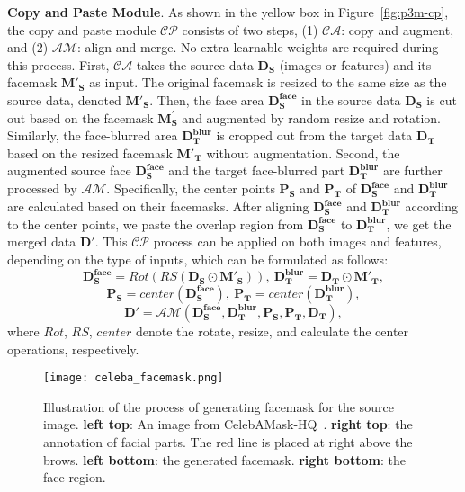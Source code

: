 \documentclass[twocolumn]{svjour3}
\begin{document}
\textbf{Copy and Paste Module}. As shown in the yellow box in Figure~\ref{fig:p3m-cp}, the copy and paste module $\mathcal{CP}$ consists of two steps, (1) $\mathcal{CA}$: copy and augment, and (2) $\mathcal{AM}$: align and merge. No extra learnable weights are required during this process. First, $\mathcal{CA}$ takes the source data $\mathbf{D_S}$ (images or features) and its facemask $\mathbf{M'_S}$ as input. The original facemask is resized to the same size as the source data, denoted $\mathbf{M'_S}$. Then, the face area $\mathbf{D_S^{face}}$ in the source data $\mathbf{D_S}$ is cut out based on the facemask $\mathbf{M_S^{'}}$ and augmented by random resize and rotation. Similarly, the face-blurred area $\mathbf{D_T^{blur}}$ is cropped out from the target data $\mathbf{D_T}$ based on the resized facemask $\mathbf{M'_T}$ without augmentation. Second, the augmented source face $\mathbf{D_S^{face}}$ and the target face-blurred part $\mathbf{D_T^{blur}}$ are further processed by $\mathcal{AM}$. Specifically, the center points $\mathbf{P_S}$ and $\mathbf{P_T}$ of $\mathbf{D_S^{face}}$ and $\mathbf{D_T^{blur}}$ are calculated based on their facemasks. After aligning $\mathbf{D_S^{face}}$ and $\mathbf{D_T^{blur}}$ according to the center points, we paste the overlap region from $\mathbf{D_S^{face}}$ to $\mathbf{D_T^{blur}}$, we get the merged data $\mathbf{D'}$. This $\mathcal{CP}$ process can be applied on both images and features, depending on the type of inputs, which can be formulated as follows:
\begin{equation}
\mathbf{D_S^{face}} = Rot(RS(\mathbf{D_S} \odot \mathbf{M'_S})),\ \mathbf{D_T^{blur}} = \mathbf{D_T} \odot \mathbf{M'_T},
\label{equa:cp-process-1}
\end{equation}
\begin{equation}
\mathbf{P_S} = center(\mathbf{D_S^{face}}), \ \mathbf{P_T} = center(\mathbf{D_T^{blur}}),
\label{equa:cp-process-2}
\end{equation}
\begin{equation}
\mathbf{D'} = \mathcal{AM}(\mathbf{D_S^{face}}, \mathbf{D_T^{blur}}, \mathbf{P_S}, \mathbf{P_T}, \mathbf{D_T}),
\label{equa:cp-process-3}
\end{equation}
where $Rot$, $RS$, $center$ denote the rotate, resize, and calculate the center operations, respectively.

\begin{figure}
    \centering
    \texttt{[image: celeba\_facemask.png]}
    \caption{Illustration of the process of generating facemask for the source image. \textbf{left top}: An image from CelebAMask-HQ~\citep{CelebAMask-HQ}. \textbf{right top}: the annotation of facial parts. The red line is placed at right above the brows. \textbf{left bottom}: the generated facemask. \textbf{right bottom}: the face region.}
    \label{fig:celeba_anno}
\end{figure}
\end{document}
